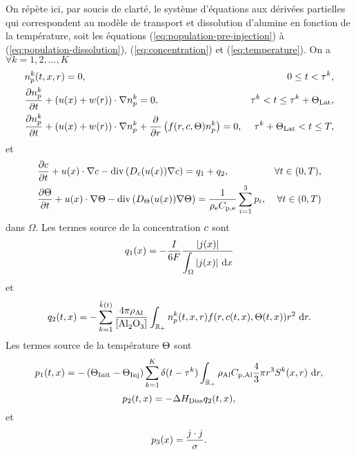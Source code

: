 On répète ici, par soucis de clarté, le système d'équations aux
dérivées partielles qui correspondent au modèle de transport et
dissolution d'alumine en fonction de la température, soit les
équations (\ref{eq:population-pre-injection}) à
(\ref{eq:population-dissolution}), (\ref{eq:concentration}) et
(\ref{eq:temperature}). On a $\forall k = 1, 2, \dots, K$
\begin{align}
  & n_p^k(t, x, r) = 0,
  & 0\leq t < \tau^k,\label{eq:mdl-eq-1}\\
%
  & \frac{\partial n_p^k}{\partial t} + \parent{u(x) + w(r)}\cdot \nabla  n_p^k = 0,
  & \tau^k < t \leq \tau^k + \tlat,\label{eq:mdl-eq-2}\\
%
  & \frac{\partial n_p^k}{\partial t} + \parent{u(x) + w(r)}\cdot \nabla  n_p^k + \frac{\partial }{\partial r}\parent{f(r, \concentration, \temperature)n_p^k} = 0,
  & \tau^k + \tlat < t \leq \tend,\label{eq:mdl-eq-3}
\end{align}
et
\begin{align}
  & \frac{\partial \concentration}{\partial t} + u(x)\cdot\nabla \concentration - \div\parent{\cdiffusivity(u(x)) \nabla \concentration} = q_1 + q_2,
  & \forall t\in (0, T),\label{eq:mdl-eq-4}\\
%
  & \frac{\partial \temperature}{\partial t} + u(x)\cdot\nabla\temperature - \div\parent{\electrolytetdiff(u(x))\nabla \temperature} = \frac{1}{\electrolytedensity\electrolytehc}\sum_{i = 1}^{3}p_i,
  & \forall t\in(0, T)\label{eq:mdl-eq-5}
\end{align}
dans $\Omega$. Les termes source de la concentration $c$ sont
\begin{equation}
  q_1(x) = -\frac{I}{6\faraday} %
  \frac{\abs{j(x)}}{\displaystyle\int_\Omega\abs{j(x)}\intd{x}}
\end{equation}
et
\begin{equation}
  q_2(t, x) = -\sum_{k = 1}^{\bar
    k(t)}\frac{4\pi\aluminadensity}{[\ce{Al2O3}]}\int_{\rplus}n_p^k(t,
  x, r)f(r, \concentration(t, x), \temperature(t, x))r^2\,\intd{r}.
\end{equation}
Les termes source de la température $\Theta$ sont
\begin{equation}
  p_1(t, x) = -\left( \Theta_\text{Init}-\Theta_\text{Inj} \right)\sum_{k = 1}^{K}\delta(t -
  \tau^k)\int_{{\mathbb R_+}}\rho_\mathrm{Al}C_{\mathrm{p,Al}}\frac{4}{3}\pi r^3 S^k(x, r)\,\,\mathrm dr,
\end{equation}
\begin{equation}
  p_2(t, x) = - \Delta H_\text{Diss} q_2(t, x),
\end{equation}
et
\begin{equation}
  p_3(x) = \frac{j\cdot j}{\sigma}.
\end{equation}

